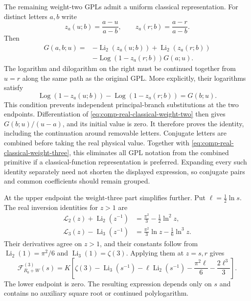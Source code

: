 The remaining weight-two GPLs admit a uniform classical representation.
For distinct letters $a,b$ write
\begin{equation}
 z_a(u;b)=\frac{a-u}{a-b},\qquad z_a(r;b)=\frac{a-r}{a-b}.
\end{equation}
Then
\begin{align}
 G(a,b;u)={}&-\operatorname{Li}_2(z_a(u;b))
              +\operatorname{Li}_2(z_a(r;b))\\
 &-\operatorname{Log}(1-z_a(r;b))G(a;u).
 \label{eq:comp-real-classical-weight-two}
\end{align}
The logarithm and dilogarithm on the right must be continued together
from $u=r$ along the same path as the original GPL. More explicitly, their
logarithms satisfy
\begin{equation}
 \operatorname{Log}(1-z_a(u;b))
 -\operatorname{Log}(1-z_a(r;b))=G(b;u).
\end{equation}
This condition prevents independent principal-branch substitutions at the
two endpoints. Differentiation of \eqref{eq:comp-real-classical-weight-two}
then gives $G(b;u)/(u-a)$, and its initial value is zero. It therefore
proves the identity, including the continuation around removable letters.
Conjugate letters are combined before taking the real physical value.
Together with \eqref{eq:comp-real-classical-weight-three}, this eliminates
all GPL notation from the combined primitive if a classical-function
representation is preferred. Expanding every such identity separately
need not shorten the displayed expression, so conjugate pairs and common
coefficients should remain grouped.

At the upper endpoint the weight-three part simplifies further.
Put $\ell=\tfrac12\ln s$. The real inversion identities for $z>1$ are
\begin{align}
 \mathcal L_2(z)+\operatorname{Li}_2(z^{-1})
 &=\frac{\pi^2}{3}-\frac12\ln^2 z,\\
 \mathcal L_3(z)-\operatorname{Li}_3(z^{-1})
 &=\frac{\pi^2}{3}\ln z-\frac16\ln^3z.
\end{align}
Their derivatives agree on $z>1$, and their constants follow from
$\operatorname{Li}_2(1)=\pi^2/6$ and
$\operatorname{Li}_3(1)=\zeta(3)$. Applying them at $z=s,r$ gives
\begin{equation}
 \mathcal F^{(3)}_{R_0+W}(s)
 =K\left[\zeta(3)-\operatorname{Li}_3(s^{-1})
 -\ell\operatorname{Li}_2(s^{-1})
 -\frac{\pi^2\ell}{6}-\frac{2\ell^3}{3}\right].
 \label{eq:comp-real-classical-weight-three-endpoint}
\end{equation}
The lower endpoint is zero. The resulting expression depends only on
$s$ and contains no auxiliary square root or continued polylogarithm.


